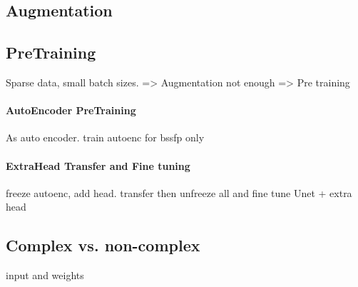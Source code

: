 \subsection{Augmentation}

\subsection{PreTraining}
Sparse data, small batch sizes. => Augmentation not enough => Pre training
\paragraph{AutoEncoder PreTraining}
As auto encoder. train autoenc for bssfp only 

\paragraph{ExtraHead Transfer and Fine tuning}
freeze autoenc, add head. transfer then unfreeze all and fine tune
Unet + extra head

\subsection{Complex vs. non-complex}
input and weights 









